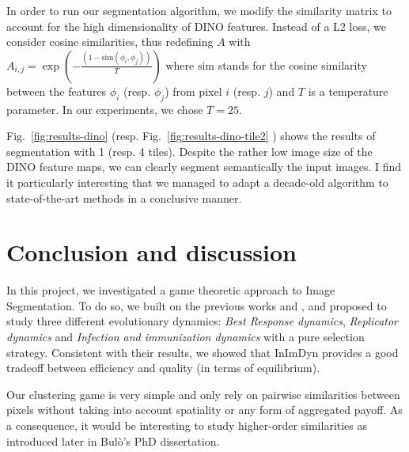 \documentclass[11pt,a4paper]{article}
\begin{document}
In order to run our segmentation algorithm, we modify the similarity matrix to account for the high dimensionality of DINO features. Instead of a L2 loss, we consider cosine similarities, thus redefining $A$ with $A_{i, j}=\exp\left(-\frac{(1-\text{sim}(\phi_i, \phi_j))}{T}\right)$ where $\text{sim}$ stands for the cosine similarity between the features $\phi_i$ (resp. $\phi_j$) from pixel $i$ (resp. $j$) and $T$ is a temperature parameter. In our experiments, we chose $T=25$.

Fig.~\ref{fig:results-dino} (resp. Fig.~\ref{fig:results-dino-tile2} ) shows the results of segmentation with 1 (resp. 4 tiles). Despite the rather low image size of the DINO feature maps, we can clearly segment semantically the input images. I find it particularly interesting that we managed to adapt a decade-old algorithm to state-of-the-art methods in a conclusive manner.

\section{Conclusion and discussion}

In this project, we investigated a game theoretic approach to Image Segmentation. To do so, we built on the previous works \cite{bulo-thesis} and \cite{game-clustering}, and proposed to study three different evolutionary dynamics: \textit{Best Response dynamics}, \textit{Replicator dynamics} and \textit{Infection and immunization dynamics} with a pure selection strategy. Consistent with their results, we showed that InImDyn provides a good tradeoff between efficiency and quality (in terms of equilibrium).

Our clustering game is very simple and only rely on pairwise similarities between pixels without taking into account spatiality or any form of aggregated payoff. As a consequence, it would be interesting to study higher-order similarities as introduced later in Bulò's PhD dissertation\cite{bulo-thesis}.



\end{document}
